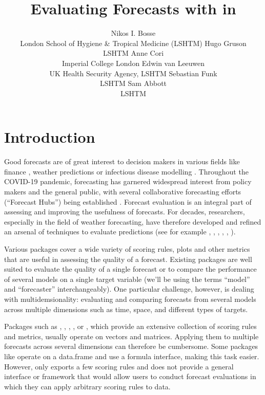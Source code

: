 \documentclass[
]{jss}
\author{
Nikos I. Bosse\\London School of Hygiene \& Tropical Medicine (LSHTM)
\AND Hugo Gruson\\LSHTM \And Anne Cori\\Imperial College London
\AND Edwin van Leeuwen\\UK Health Security Agency,
LSHTM \And Sebastian Funk\\LSHTM \And Sam Abbott\\LSHTM
}
\title{Evaluating Forecasts with \pkg{scoringutils} in \proglang{R}}
\begin{document}
\section{Introduction}\label{introduction}

Good forecasts are of great interest to decision makers in various
fields like finance
\citep{timmermannForecastingMethodsFinance2018, elliottForecastingEconomicsFinance2016},
weather predictions
\citep{gneitingWeatherForecastingEnsemble2005, kukkonenReviewOperationalRegionalscale2012}
or infectious disease modelling
\citep{reichCollaborativeMultiyearMultimodel2019, funkShorttermForecastsInform2020, cramerEvaluationIndividualEnsemble2021, bracherShorttermForecastingCOVID192021, europeancovid-19forecasthubEuropeanCovid19Forecast2021}.
Throughout the COVID-19 pandemic, forecasting has garnered widespread
interest from policy makers and the general public, with several
collaborative forecasting efforts (``Forecast Hubs'') being established
\citep{reichCollaborativeMultiyearMultimodel2019, cramerCOVID19ForecastHub2020, europeancovid-19forecasthubEuropeanCovid19Forecast2021, bracherNationalSubnationalShortterm2021}.
Forecast evaluation is an integral part of assessing and improving the
usefulness of forecasts. For decades, researchers, especially in the
field of weather forecasting, have therefore developed and refined an
arsenal of techniques to evaluate predictions (see for example
\cite{goodRationalDecisions1952},
\cite{epsteinScoringSystemProbability1969, murphyNoteRankedProbability1971a, mathesonScoringRulesContinuous1976},
\cite{gneitingProbabilisticForecastsCalibration2007},
\cite{funkAssessingPerformanceRealtime2019},
\cite{gneitingStrictlyProperScoring2007},
\cite{bracherEvaluatingEpidemicForecasts2021}).

Various  \citep{R} packages cover a wide variety of scoring
rules, plots and other metrics that are useful in assessing the quality
of a forecast. Existing packages are well suited to evaluate the quality
of a single forecast or to compare the performance of several models on
a single target variable (we'll be using the terms ``model'' and
``forecaster'' interchangeably). One particular challenge, however, is
dealing with multidemsionality: evaluating and comparing forecasts from
several models across multiple dimensions such as time, space, and
different types of targets.

Packages such as  \citep{scoringRules}, 
\citep{Metrics},  \citep{MLmetrics}, 
\citep{verification}, or 
\citep{SpecsVerification}, which provide an extensive collection of
scoring rules and metrics, usually operate on vectors and matrices.
Applying them to multiple forecasts across several dimensions can
therefore be cumbersome. Some packages like 
\citep{scoring} operate on a data.frame and use a formula interface,
making this task easier. However,  only exports a few
scoring rules and does not provide a general interface or framework that
would allow users to conduct forecast evaluations in which they can
apply arbitrary scoring rules to data.
\end{document}

